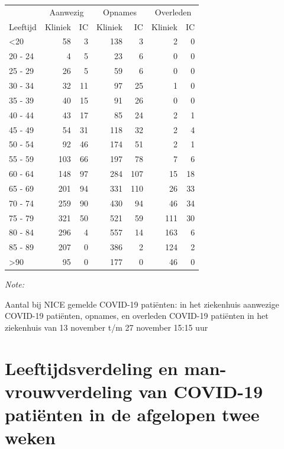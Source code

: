\documentclass[
  english,
  man,floatsintext]{apa6}
\begin{document}
\begin{table}
\centering\begingroup\fontsize{10}{12}\selectfont

\begin{threeparttable}
\begin{tabular}{lrrrrrr}
\toprule
\multicolumn{1}{c}{ } & \multicolumn{2}{c}{Aanwezig} & \multicolumn{2}{c}{Opnames} & \multicolumn{2}{c}{Overleden} \\
\cmidrule(l{3pt}r{3pt}){2-3} \cmidrule(l{3pt}r{3pt}){4-5} \cmidrule(l{3pt}r{3pt}){6-7}
Leeftijd & Kliniek & IC & Kliniek & IC & Kliniek & IC\\
\midrule
<20 & 58 & 3 & 138 & 3 & 2 & 0\\
20 - 24 & 4 & 5 & 23 & 6 & 0 & 0\\
25 - 29 & 26 & 5 & 59 & 6 & 0 & 0\\
30 - 34 & 32 & 11 & 97 & 25 & 1 & 0\\
35 - 39 & 40 & 15 & 91 & 26 & 0 & 0\\
40 - 44 & 43 & 17 & 85 & 24 & 2 & 1\\
45 - 49 & 54 & 31 & 118 & 32 & 2 & 4\\
50 - 54 & 92 & 46 & 174 & 51 & 2 & 1\\
55 - 59 & 103 & 66 & 197 & 78 & 7 & 6\\
60 - 64 & 148 & 97 & 284 & 107 & 15 & 18\\
65 - 69 & 201 & 94 & 331 & 110 & 26 & 33\\
70 - 74 & 259 & 90 & 430 & 94 & 46 & 34\\
75 - 79 & 321 & 50 & 521 & 59 & 111 & 30\\
80 - 84 & 296 & 4 & 557 & 14 & 163 & 6\\
85 - 89 & 207 & 0 & 386 & 2 & 124 & 2\\
>90 & 95 & 0 & 177 & 0 & 46 & 0\\
\bottomrule
\end{tabular}
\begin{tablenotes}
\item \textit{Note: } 
\item Aantal bij NICE gemelde COVID-19 patiënten: in het ziekenhuis aanwezige COVID-19 patiënten, opnames, en overleden COVID-19 patiënten in het ziekenhuis van 13 november t/m 27 november 15:15 uur
\end{tablenotes}
\end{threeparttable}
\endgroup{}
\end{table}

\newpage

\hypertarget{leeftijdsverdeling-en-man-vrouwverdeling-van-covid-19-patiuxebnten-in-de-afgelopen-twee-weken}{%
\section{Leeftijdsverdeling en man-vrouwverdeling van COVID-19 patiënten in de afgelopen twee weken}\label{leeftijdsverdeling-en-man-vrouwverdeling-van-covid-19-patiuxebnten-in-de-afgelopen-twee-weken}}
\end{document}
